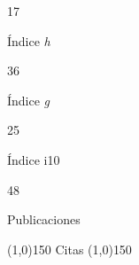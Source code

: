 \documentclass[11pt,a4paper,]{awesome-cv}
\begin{document}
\begin{tcolorbox}[enhanced,
  on line,
  boxsep=4pt, left=0pt,right=0pt,top=0pt,bottom=0pt,
  colframe=white,colback=teal,
  hyperurl={https://scholar.google.com/citations?user=8Q0jKHsAAAAJ}]

\color{white}
  \begin{minipage}[c]{0.245\linewidth}
    \begin{center}
      \begin{huge} 17 \end{huge}
      \begin{small} Índice \textit{h} \end{small}
    \end{center}
  \end{minipage}
  \begin{minipage}[c]{0.245\linewidth}
    \begin{center}
      \begin{huge} 36 \end{huge}
      \begin{small} Índice \textit{g} \end{small}
    \end{center}
  \end{minipage}
  \begin{minipage}[c]{0.245\linewidth}
    \begin{center}
      \begin{huge} 25 \end{huge}
      \begin{small} Índice i10 \end{small}
    \end{center}
  \end{minipage}
  \begin{minipage}[c]{0.245\linewidth}
    \begin{center}
      \begin{huge} 48 \end{huge}
      \begin{small} Publicaciones \end{small}
    \end{center}
  \end{minipage}

  \begin{center} \noindent\line(1,0){150} Citas \noindent\line(1,0){150} \end{center}


\end{tcolorbox}
\end{document}
